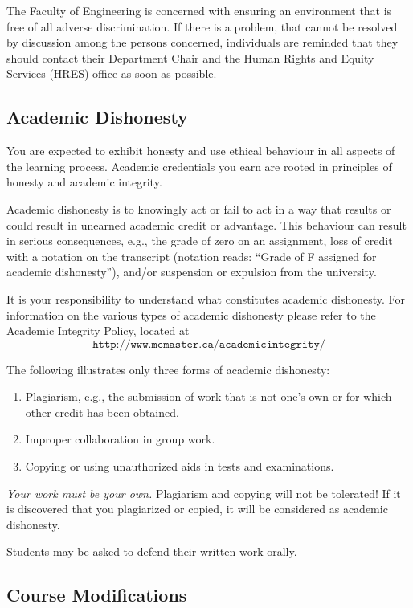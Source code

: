 \documentclass[12pt]{article}
\newcommand{\be}{\begin{enumerate}}
\newcommand{\ee}{\end{enumerate}}
\begin{document}
The Faculty of Engineering is concerned with ensuring an environment
that is free of all adverse discrimination.  If there is a problem,
that cannot be resolved by discussion among the persons concerned,
individuals are reminded that they should contact their Department
Chair and the Human Rights and Equity Services (HRES) office as soon
as possible.

\subsection {Academic Dishonesty}

You are expected to exhibit honesty and use ethical behaviour in all aspects of
the learning process.  Academic credentials you earn are rooted in principles of
honesty and academic integrity.

Academic dishonesty is to knowingly act or fail to act in a way that results or
could result in unearned academic credit or advantage.  This behaviour can result
in serious consequences, e.g., the grade of zero on an assignment, loss of
credit with a notation on the transcript (notation reads: ``Grade of F assigned
for academic dishonesty''), and/or suspension or expulsion from the university.

It is your responsibility to understand what constitutes academic dishonesty.
For information on the various types of academic dishonesty please refer to the
Academic Integrity Policy, located at
\[\texttt{http://www.mcmaster.ca/academicintegrity/}\]

\noindent The following illustrates only three forms of academic dishonesty:

\be

\item Plagiarism, e.g., the submission of work that is not one's own or for
  which other credit has been obtained.

\item Improper collaboration in group work.

\item Copying or using unauthorized aids in tests and examinations.

  \ee

\emph{Your work must be your own.}  Plagiarism and copying will not be
tolerated!  If it is discovered that you plagiarized or copied, it
will be considered as academic dishonesty.

Students may be asked to defend their written work orally.

\subsection*{Course Modifications}
\end{document}

